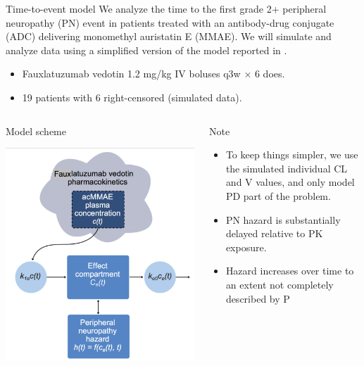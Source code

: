 \documentclass[presentation, allowframebreaks]{beamer}
\begin{document}
\begin{frame}[label={sec:orgb7e6aba}]{Time-to-event model}
We analyze the time to the first grade 2+ peripheral neuropathy
(PN) event in patients treated with an antibody-drug conjugate (ADC) delivering monomethyl auristatin E
(MMAE). We will simulate and analyze data using a simplified version of the
model reported in \cite{lu_time--event_2017}.
\begin{itemize}
\item Fauxlatuzumab vedotin 1.2 mg/kg IV boluses q3w \(\times\) 6 does.
\item 19 patients with 6 right-censored (simulated data).
\end{itemize}
\begin{columns}
\begin{column}{0.3\columnwidth}
\begin{block}{Model scheme}
\begin{center}
\includegraphics[width=0.9\columnwidth]{./figures/lu2017Model.pdf}
\end{center}
\end{block}
\end{column}
\begin{column}{0.7\columnwidth}
\begin{block}{Note}
\begin{itemize}
\item To keep things simpler, we use the simulated individual CL and V values, and only model PD part of the problem.
\item PN hazard is substantially delayed relative to PK exposure.
\item Hazard increases over time to an extent not completely described by P
\end{itemize}
\end{block}
\end{column}
\end{columns}
\end{frame}
\end{document}
